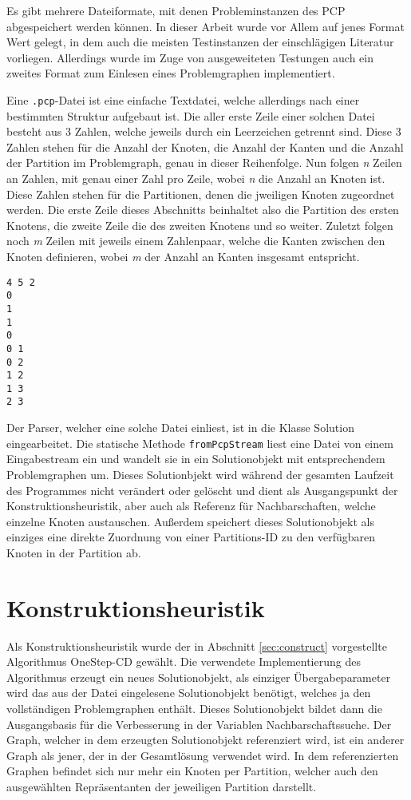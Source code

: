 Es gibt mehrere Dateiformate, mit denen Probleminstanzen des PCP abgespeichert werden können. In dieser Arbeit wurde vor Allem auf jenes
Format Wert gelegt, in dem auch die meisten Testinstanzen der einschlägigen Literatur vorliegen. Allerdings wurde im Zuge von aus\-ge\-wei\-te\-ten 
Testungen auch ein zweites Format zum Einlesen eines Problemgraphen implementiert. 

Eine \texttt{.pcp}-Datei ist eine einfache Textdatei, welche allerdings nach einer bestimmten Struktur aufgebaut ist. Die aller erste Zeile
einer solchen Datei besteht aus 3 Zahlen, welche jeweils durch ein Leerzeichen getrennt sind. Diese 3 Zahlen stehen für die Anzahl der Knoten, 
die Anzahl der Kanten und die Anzahl der Partition im Problemgraph, genau in dieser Reihenfolge. Nun folgen \textit{n} Zeilen an Zahlen, mit 
genau einer Zahl pro Zeile, wobei \textit{n} die Anzahl an Knoten ist. Diese Zahlen stehen für die Partitionen, denen die jweiligen Knoten zugeordnet werden.
Die erste Zeile dieses Abschnitts beinhaltet also die Partition des ersten Knotens, die zweite Zeile die des zweiten Knotens und so weiter. Zuletzt folgen noch
\textit{m} Zeilen mit jeweils einem Zahlenpaar, welche die Kanten zwischen den Knoten definieren, wobei \textit{m} der Anzahl an Kanten insgesamt
entspricht.

\singlespacing
\begin{lstlisting}[caption={Eine einfache \textit{.pcp}-Beispieldatei},label={lst:pcp}]
4 5 2
0
1
1
0
0 1
0 2
1 2
1 3
2 3
\end{lstlisting}

Der Parser, welcher eine solche Datei einliest, ist in die Klasse Solution eingearbeitet. Die statische Methode \texttt{fromPcpStream} liest eine
Datei von einem Eingabestream ein und wandelt sie in ein Solutionobjekt mit entsprechendem Problemgraphen um. Dieses Solutionbjekt wird während
der gesamten Laufzeit des Programmes nicht verändert oder gelöscht und dient als Ausgangspunkt der Konstruktionsheuristik, aber auch als
Referenz für Nachbarschaften, welche einzelne Knoten austauschen. Außerdem speichert dieses Solutionobjekt als einziges eine direkte Zuordnung von einer Partitions-ID
zu den verfügbaren Knoten in der Partition ab. 

\section{Konstruktionsheuristik}
Als Konstruktionsheuristik wurde der in Abschnitt \ref{sec:construct} vorgestellte Algorithmus OneStep-CD gewählt. Die verwendete Implementierung des Algorithmus
erzeugt ein neues Solutionobjekt, als einziger Übergabeparameter wird das aus der Datei eingelesene Solutionobjekt benötigt, welches ja den vollständigen Problemgraphen
enthält. Dieses Solutionobjekt bildet dann die Ausgangsbasis für die Verbesserung in der Variablen Nachbarschaftssuche. Der Graph, welcher in dem erzeugten Solutionobjekt
referenziert wird, ist ein anderer Graph als jener, der in der Gesamtlösung verwendet wird. In dem referenzierten Graphen befindet sich nur mehr ein Knoten per Partition, welcher auch den ausgewählten Repräsentanten der jeweiligen Partition darstellt.

